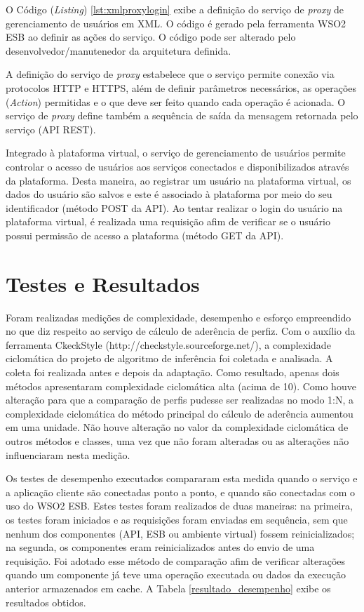 O Código (\textit{Listing}) \ref{lst:xmlproxylogin} exibe a definição do serviço de \textit{proxy} de gerenciamento de usuários em XML. O código é gerado pela ferramenta WSO2 ESB ao definir as ações do serviço. O código pode ser alterado pelo desenvolvedor/manutenedor da arquitetura definida.

A definição do serviço de \textit{proxy} estabelece que o serviço permite conexão via protocolos HTTP e HTTPS, além de definir parâmetros necessários, as operações (\textit{Action}) permitidas e o que deve ser feito quando cada operação é acionada. O serviço de \textit{proxy} define também a sequência de saída da mensagem retornada pelo serviço (API REST).

Integrado à plataforma virtual, o serviço de gerenciamento de usuários permite controlar o acesso de usuários aos serviços conectados e disponibilizados através da plataforma. Desta maneira, ao registrar um usuário na plataforma virtual, os dados do usuário são salvos e este é associado à plataforma por meio do seu identificador (método POST da API). Ao tentar realizar o login do usuário na plataforma virtual, é realizada uma requisição afim de verificar se o usuário possui permissão de acesso a plataforma (método GET da API).

\section{Testes e Resultados}
Foram realizadas medições de complexidade, desempenho e esforço empreendido no que diz respeito ao serviço de cálculo de aderência de perfiz. Com o auxílio da ferramenta CkeckStyle (http://checkstyle.sourceforge.net/), a complexidade ciclomática do projeto de algoritmo de inferência foi coletada e analisada. A coleta foi realizada antes e depois da adaptação. Como resultado, apenas dois métodos apresentaram complexidade ciclomática alta (acima de 10). Como houve alteração para que a comparação de perfis pudesse ser realizadas no modo 1:N, a complexidade ciclomática do método principal do cálculo de aderência aumentou em uma unidade. Não houve alteração no valor da complexidade ciclomática de outros métodos e classes, uma vez que não foram alteradas ou as alterações não influenciaram nesta medição.

Os testes de desempenho executados compararam esta medida quando o serviço e a aplicação cliente são conectadas ponto a ponto, e quando são conectadas com o uso do WSO2 ESB. Estes testes foram realizados de duas maneiras: na primeira, os testes foram iniciados e as requisições foram enviadas em sequência, sem que nenhum dos componentes (API, ESB ou ambiente virtual) fossem reinicializados; na segunda, os componentes eram reinicializados antes do envio de uma requisição. Foi adotado esse método de comparação afim de verificar alterações quando um componente já teve uma operação executada ou dados da execução anterior armazenados em cache. A Tabela \ref{resultado_desempenho} exibe os resultados obtidos.

